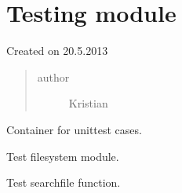\documentclass[letterpaper,10pt,english]{sphinxmanual}
\begin{document}
\section{Testing module}
\label{testing:module-testing}\label{testing:testing-module}\label{testing::doc}
Created on 20.5.2013
\begin{quote}\begin{description}
\item[{author}] \leavevmode
Kristian

\end{description}\end{quote}

\begin{fulllineitems}
\label{testing:testing.DiwaTest}
Container for unittest cases.

\end{fulllineitems}


\begin{fulllineitems}
\label{testing:testing.TestFilesystem}
Test filesystem module.

\begin{fulllineitems}
\label{testing:testing.TestFilesystem.test_searchfile}
Test searchfile function.

\end{fulllineitems}


\end{fulllineitems}

\end{document}
